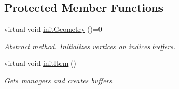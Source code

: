 \subsection*{Protected Member Functions}
\begin{DoxyCompactItemize}
\item 
\mbox{\label{class_geometry_engine_1_1_geometry_world_item_1_1_geometry_item_1_1_geometry_item_a714b6742a99f60faddf9e486f5a5d71d}} 
virtual void \mbox{\hyperlink{class_geometry_engine_1_1_geometry_world_item_1_1_geometry_item_1_1_geometry_item_a714b6742a99f60faddf9e486f5a5d71d}{init\+Geometry}} ()=0
\begin{DoxyCompactList}\small\item\em Abstract method. Initializes vertices an indices buffers. \end{DoxyCompactList}\item 
\mbox{\label{class_geometry_engine_1_1_geometry_world_item_1_1_geometry_item_1_1_geometry_item_a9ccef8be90d38736e82f0d9666938b8a}} 
virtual void \mbox{\hyperlink{class_geometry_engine_1_1_geometry_world_item_1_1_geometry_item_1_1_geometry_item_a9ccef8be90d38736e82f0d9666938b8a}{init\+Item}} ()
\begin{DoxyCompactList}\small\item\em Gets managers and creates buffers. \end{DoxyCompactList}\end{DoxyCompactItemize}
